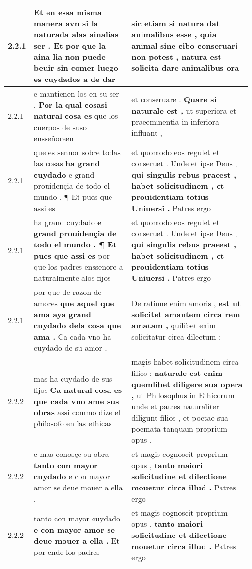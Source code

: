 \begin{tabular}{|p{1cm}|p{6.5cm}|p{6.5cm}|}
2.2.1 & Et en essa misma manera avn si la naturada alas ainalias ser . \textbf{ Et por que la aina lia non puede beuir sin comer } luego es cuydados a de dar & sic etiam si natura dat animalibus esse , \textbf{ quia animal sine cibo conseruari non potest , } natura est solicita dare animalibus ora \\\hline
2.2.1 & e mantienen los en su ser . \textbf{ Por la qual cosasi natural cosa es } que los cuerpos de suso ensseñoreen & et conseruare . \textbf{ Quare si naturale est , } ut superiora et praeeminentia in inferiora influant , \\\hline
2.2.1 & que es sennor sobre todas las cosas \textbf{ ha grand cuydado } e grand prouidençia de todo el mundo . ¶ Et pues que assi es & et quomodo eos regulet et conseruet . Unde et ipse Deus , \textbf{ qui singulis rebus praeest , habet solicitudinem , et prouidentiam totius Uniuersi . } Patres ergo \\\hline
2.2.1 & ha grand cuydado \textbf{ e grand prouidençia de todo el mundo . ¶ Et pues que assi es } por que los padres enssenore a naturalmente alos fijos & et quomodo eos regulet et conseruet . Unde et ipse Deus , \textbf{ qui singulis rebus praeest , habet solicitudinem , et prouidentiam totius Uniuersi . } Patres ergo \\\hline
2.2.1 & por que de razon de amores \textbf{ que aquel que ama aya grand cuydado dela cosa que ama . } Ca cada vno ha cuydado de su amor . & De ratione enim amoris , \textbf{ est ut solicitet amantem circa rem amatam , } quilibet enim solicitatur circa dilectum : \\\hline
2.2.2 & mas ha cuydado de sus fijos \textbf{ Ca natural cosa es que cada vno ame sus obras } assi commo dize el philosofo en las ethicas & magis habet solicitudinem circa filios : \textbf{ naturale est enim quemlibet diligere sua opera , } ut Philosophus in Ethicorum unde et patres naturaliter diligunt filios , et poetae sua poemata tanquam proprium opus . \\\hline
2.2.2 & e mas conosçe su obra \textbf{ tanto con mayor cuydado } e con mayor amor se deue mouer a ella . & et magis cognoscit proprium opus , \textbf{ tanto maiori solicitudine et dilectione mouetur circa illud . } Patres ergo \\\hline
2.2.2 & tanto con mayor cuydado \textbf{ e con mayor amor se deue mouer a ella . } Et por ende los padres & et magis cognoscit proprium opus , \textbf{ tanto maiori solicitudine et dilectione mouetur circa illud . } Patres ergo \\\hline

\end{tabular}

